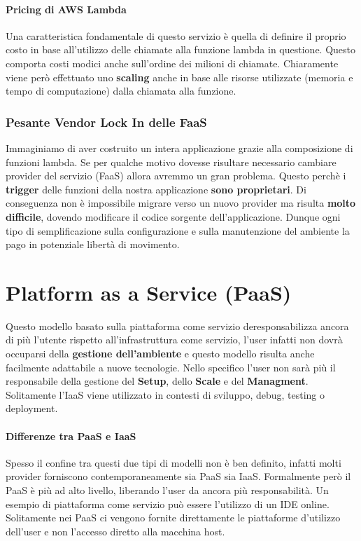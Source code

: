 \documentclass{article}
\begin{document}
\paragraph{Pricing di AWS Lambda} Una caratteristica fondamentale di questo servizio è quella di definire il proprio costo in base all'utilizzo delle chiamate alla funzione lambda in questione. Questo comporta costi modici anche sull'ordine dei milioni di chiamate. Chiaramente viene però effettuato uno \textbf{scaling} anche in base alle risorse utilizzate (memoria e tempo di computazione) dalla chiamata alla funzione.

\subsubsection{Pesante Vendor Lock In delle FaaS}

Immaginiamo di aver costruito un intera applicazione grazie alla composizione di funzioni lambda. Se per qualche motivo dovesse risultare necessario cambiare provider del servizio (FaaS) allora avremmo un gran problema. Questo perchè i \textbf{trigger} delle funzioni della nostra applicazione \textbf{sono proprietari}. Di conseguenza non è impossibile migrare verso un nuovo provider ma risulta \textbf{molto difficile}, dovendo modificare il codice sorgente dell'applicazione. Dunque ogni tipo di semplificazione sulla configurazione e sulla manutenzione del ambiente la pago in potenziale libertà di movimento.

\newpage

\section{Platform as a Service (PaaS)}

Questo modello basato sulla piattaforma come servizio deresponsabilizza ancora di più l'utente
rispetto all'infrastruttura come servizio, l'user infatti non dovrà occuparsi della \textbf{gestione dell'ambiente}
e questo modello risulta anche facilmente adattabile a nuove tecnologie. Nello specifico l'user non sarà più
il responsabile della gestione del \textbf{Setup}, dello \textbf{Scale} e del \textbf{Managment}.
Solitamente l'IaaS viene utilizzato in contesti di sviluppo, debug, testing o deployment.

\paragraph{Differenze tra PaaS e IaaS} Spesso il confine tra questi due tipi di modelli non è ben definito, infatti molti provider forniscono contemporaneamente sia PaaS sia IaaS.
Formalmente però il PaaS è più ad alto livello, liberando l'user da ancora più responsabilità. Un esempio di piattaforma come servizio può essere l'utilizzo di un IDE online. Solitamente nei PaaS ci
vengono fornite direttamente le piattaforme d'utilizzo dell'user e non l'accesso diretto alla macchina host.
\end{document}
